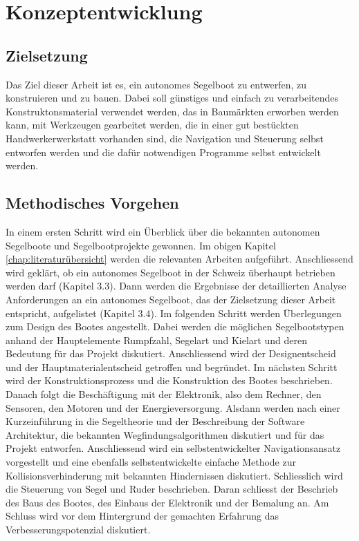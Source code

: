 
\chapter{Konzeptentwicklung }
\label{chap:konzeptentwicklung}
\section{Zielsetzung}
Das Ziel dieser Arbeit ist es, ein autonomes Segelboot zu entwerfen, zu konstruieren und zu bauen. Dabei soll günstiges und einfach zu verarbeitendes Konstruktonsmaterial verwendet werden, das in Baumärkten erworben werden kann, mit Werkzeugen gearbeitet werden, die in einer gut bestückten Handwerkerwerkstatt vorhanden sind, die Navigation und Steuerung selbst entworfen werden und die dafür notwendigen Programme selbst entwickelt werden. 

\section{Methodisches Vorgehen}

In einem ersten Schritt wird ein Überblick über die bekannten autonomen Segelboote und Segelbootprojekte gewonnen. Im obigen Kapitel \ref{chap:literaturübersicht} werden die relevanten Arbeiten aufgeführt. Anschliessend wird geklärt, ob ein autonomes Segelboot in der Schweiz überhaupt betrieben werden darf (Kapitel 3.3). Dann werden die Ergebnisse der detaillierten Analyse Anforderungen an ein autonomes Segelboot, das der Zielsetzung dieser Arbeit entspricht, aufgelistet (Kapitel 3.4). Im folgenden Schritt werden Überlegungen zum Design des Bootes angestellt. Dabei werden die möglichen Segelbootstypen anhand der Hauptelemente Rumpfzahl, Segelart und Kielart und deren Bedeutung für das Projekt diskutiert. Anschliessend wird der Designentscheid und der Hauptmaterialentscheid getroffen und begründet. Im nächsten Schritt wird der Konstruktionsprozess und die Konstruktion des Bootes beschrieben. Danach folgt die Beschäftigung mit der Elektronik, also dem Rechner, den Sensoren, den Motoren und der Energieversorgung. Alsdann werden nach einer Kurzeinführung in die Segeltheorie und der Beschreibung der Software Architektur, die bekannten Wegfindungsalgorithmen diskutiert und für das Projekt entworfen. Anschliessend wird ein selbstentwickelter Navigationsansatz vorgestellt und eine ebenfalls selbstentwickelte einfache Methode zur Kollisionsverhinderung mit bekannten Hindernissen diskutiert. Schliesslich wird die Steuerung von Segel und Ruder beschrieben. Daran schliesst der Beschrieb des Baus des Bootes, des Einbaus der Elektronik und der Bemalung an. Am Schluss wird vor dem Hintergrund der gemachten Erfahrung das Verbesserungspotenzial diskutiert.
